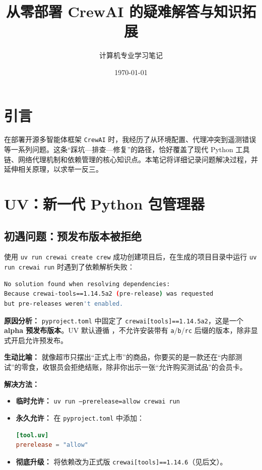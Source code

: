 \documentclass[12pt,a4paper]{ctexart}
\title{\textbf{从零部署 CrewAI 的疑难解答与知识拓展}}
\author{计算机专业学习笔记}
\date{\today}
\begin{document}
\maketitle

\section{引言}
在部署开源多智能体框架 \texttt{CrewAI} 时，我经历了从环境配置、代理冲突到遥测错误等一系列问题。这条“踩坑—排查—修复”的路径，恰好覆盖了现代 Python 工具链、网络代理机制和依赖管理的核心知识点。本笔记将详细记录问题解决过程，并延伸相关原理，以求举一反三。

\section{UV：新一代 Python 包管理器}
\subsection{初遇问题：预发布版本被拒绝}
使用 \texttt{uv run crewai create crew} 成功创建项目后，在生成的项目目录中运行 \texttt{uv run crewai run} 时遇到了依赖解析失败：

\begin{lstlisting}[language=bash, caption=依赖解析错误]
No solution found when resolving dependencies:
Because crewai-tools==1.14.5a2 (pre-release) was requested 
but pre-releases weren't enabled.
\end{lstlisting}

\noindent\textbf{原因分析：} \texttt{pyproject.toml} 中固定了 \texttt{crewai[tools]==1.14.5a2}，这是一个 \textbf{alpha 预发布版本}。UV 默认遵循 ，不允许安装带有 \texttt{a}/\texttt{b}/\texttt{rc} 后缀的版本，除非显式开启允许预发布。

\noindent\textbf{生动比喻：} 就像超市只摆出“正式上市”的商品，你要买的是一款还在“内部测试”的零食，收银员会拒绝结账，除非你出示一张“允许购买测试品”的会员卡。

\noindent\textbf{解决方法：}
\begin{itemize}
    \item \textbf{临时允许：} \texttt{uv run --prerelease=allow crewai run}
    \item \textbf{永久允许：} 在 \texttt{pyproject.toml} 中添加：
\begin{lstlisting}[language=toml, caption=启用预发布支持]
[tool.uv]
prerelease = "allow"
\end{lstlisting}
    \item \textbf{彻底升级：} 将依赖改为正式版 \texttt{crewai[tools]==1.14.6}（见后文）。
\end{itemize}
\end{document}
